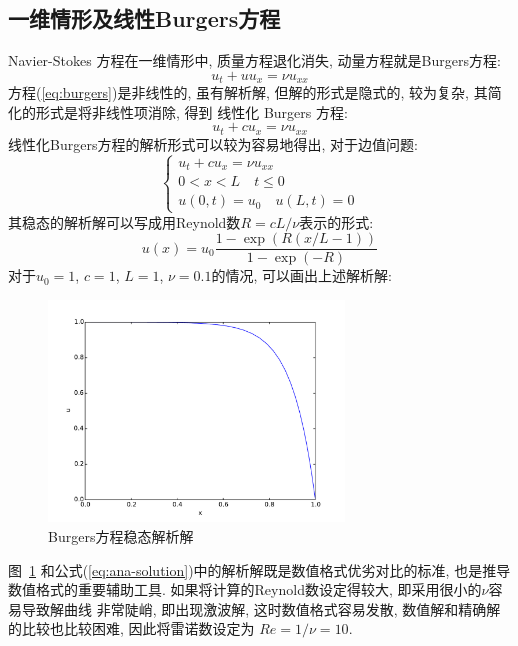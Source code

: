\documentclass[hyperref,UTF8,titlepage]{ctexart}
\newcommand{\mRe}{\mathit{Re}}
\begin{document}
\subsection{一维情形及线性Burgers方程}
\label{sec:1.2}
Navier-Stokes 方程在一维情形中, 质量方程退化消失, 动量方程就是Burgers方程:
\begin{equation}
  \label{eq:burgers}
  u_t+uu_x=\nu u_{xx}
\end{equation}
方程(\ref{eq:burgers})是非线性的, 虽有解析解, 但解的形式是隐式的, 较为复杂, 其简化的形式是将非线性项消除, 得到
线性化 Burgers 方程:
\begin{equation}
  \label{eq:lin-burgers}
  u_t+cu_x=\nu u_{xx}
\end{equation}
线性化Burgers方程的解析形式可以较为容易地得出, 对于边值问题:
\begin{equation*}
  \begin{cases}
    u_t+cu_x=\nu u_{xx} \\
    0<x<L\quad t\leq 0 \\
    u(0, t) = u_0 \quad u(L, t) = 0
  \end{cases}
\end{equation*}
其稳态的解析解可以写成用Reynold数$R=cL/\nu$表示的形式:
\begin{equation}
  \label{eq:ana-solution}
  u(x) = u_0\frac{1-\exp(R(x/L-1))}{1-\exp(-R)}
\end{equation}
对于$u_0=1$, $c=1$, $L=1$, $\nu=0.1$的情况, 可以画出上述解析解:
\begin{figure}[H]
  \centering
  \includegraphics[width=0.7\textwidth]{exact.pdf}
  \caption{Burgers方程稳态解析解}
  \label{fig:ana-solution}
\end{figure}
图~\ref{fig:ana-solution} 和公式(\ref{eq:ana-solution})中的解析解既是数值格式优劣对比的标准, 
也是推导数值格式的重要辅助工具. 如果将计算的Reynold数设定得较大, 即采用很小的$\nu$容易导致解曲线
非常陡峭, 即出现激波解, 这时数值格式容易发散, 数值解和精确解的比较也比较困难, 因此将雷诺数设定为
$\mRe=1/\nu=10$.
\end{document}
